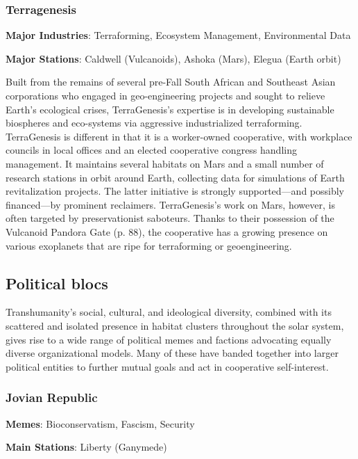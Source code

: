 \subsubsection{Terragenesis}
\label{sec:terragenesis}

\textbf{Major Industries}: Terraforming, Ecosystem Management,
Environmental Data

\textbf{Major Stations}: Caldwell (Vulcanoids), Ashoka (Mars), Elegua
(Earth orbit)


Built from the remains of several pre-Fall South African and Southeast
Asian corporations who engaged in geo-engineering projects and sought
to relieve Earth's ecological crises, TerraGenesis's expertise is in
developing sustainable biospheres and eco-systems via aggressive
industrialized terraforming. TerraGenesis is different in that it is a
worker-owned cooperative, with workplace councils in local offices and
an elected cooperative congress handling management. It maintains
several habitats on Mars and a small number of research stations in
orbit around Earth, collecting data for simulations of Earth
revitalization projects. The latter initiative is strongly
supported—and possibly financed—by prominent
reclaimers. TerraGenesis's work on Mars, however, is often targeted by
preservationist saboteurs. Thanks to their possession of the Vulcanoid
Pandora Gate (p. 88), the cooperative has a growing presence on
various exoplanets that are ripe for terraforming or geoengineering.

\subsection{Political blocs}
\label{sec:political-blocs-1}

Transhumanity's social, cultural, and ideological diversity, combined
with its scattered and isolated presence in habitat clusters
throughout the solar system, gives rise to a wide range of political
memes and factions advocating equally diverse organizational
models. Many of these have banded together into larger political
entities to further mutual goals and act in cooperative self-interest.

\subsubsection{Jovian Republic}
\label{sec:jovian-republic}

\textbf{Memes}: Bioconservatism, Fascism, Security

\textbf{Main Stations}: Liberty (Ganymede)


